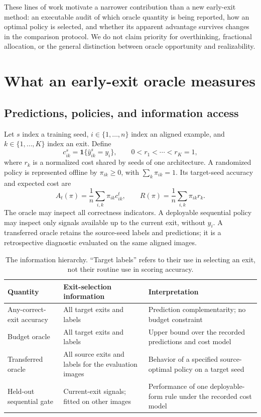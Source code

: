 \documentclass[11pt,a4paper]{article}
\newcommand{\ind}{\mathbf{1}}
\begin{document}
These lines of work motivate a narrower contribution than a new early-exit method: an executable audit of which oracle quantity is being reported, how an optimal policy is selected, and whether its apparent advantage survives changes in the comparison protocol. We do not claim priority for overthinking, fractional allocation, or the general distinction between oracle opportunity and realizability.

\section{What an early-exit oracle measures}
\subsection{Predictions, policies, and information access}
Let $s$ index a training seed, $i\in\{1,\ldots,n\}$ index an aligned example, and $k\in\{1,\ldots,K\}$ index an exit. Define
\begin{equation}
 c^{s}_{ik}=\ind\{\widehat y^{s}_{ik}=y_i\}, \qquad
 0<r_1<\cdots<r_K=1,
\end{equation}
where $r_k$ is a normalized cost shared by seeds of one architecture. A randomized policy is represented offline by $\pi_{ik}\geq0$, with $\sum_k\pi_{ik}=1$. Its target-seed accuracy and expected cost are
\begin{equation}
 A_t(\pi)=\frac1n\sum_{i,k}\pi_{ik}c^t_{ik},\qquad
 R(\pi)=\frac1n\sum_{i,k}\pi_{ik}r_k.
 \label{eq:policy}
\end{equation}
The oracle may inspect all correctness indicators. A deployable sequential policy may inspect only signals available up to the current exit, without $y_i$. A transferred oracle retains the source-seed labels and predictions; it is a retrospective diagnostic evaluated on the same aligned images.

\begin{table}[t]
\centering\small
\caption{The information hierarchy. ``Target labels'' refers to their use in selecting an exit, not their routine use in scoring accuracy.}
\begin{tabularx}{\linewidth}{@{}lXX@{}}
\toprule
Quantity & Exit-selection information & Interpretation \\
\midrule
Any-correct-exit accuracy & All target exits and labels & Prediction complementarity; no budget constraint \\
Budget oracle & All target exits and labels & Upper bound over the recorded predictions and cost model \\
Transferred oracle & All source exits and labels for the evaluation images & Behavior of a specified source-optimal policy on a target seed \\
Held-out sequential gate & Current-exit signals; fitted on other images & Performance of one deployable-form rule under the recorded cost model \\
\bottomrule
\end{tabularx}
\label{tab:hierarchy}
\end{table}
\end{document}
